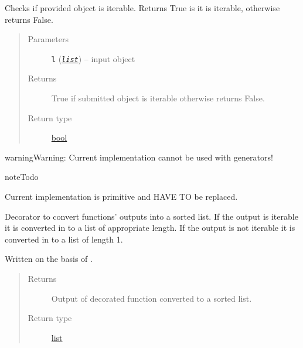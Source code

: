 \documentclass[a4paper,10pt,english]{sphinxmanual}
\begin{document}
\begin{fulllineitems}
\label{aqueduct.utils.helpers:aqueduct.utils.helpers.is_iterable}
Checks if provided object is iterable.
Returns True is it is iterable, otherwise returns False.
\begin{quote}\begin{description}
\item[{Parameters}] \leavevmode
\textbf{\texttt{l}} (\href{https://docs.python.org/2/library/functions.html\#list}{\emph{\texttt{list}}}) -- input object

\item[{Returns}] \leavevmode
True if submitted object is iterable otherwise returns False.

\item[{Return type}] \leavevmode
\href{https://docs.python.org/2/library/functions.html\#bool}{bool}

\end{description}\end{quote}

\begin{notice}{warning}{Warning:}
Current implementation cannot be used with generators!
\end{notice}

\begin{notice}{note}{Todo}

Current implementation is primitive and HAVE TO be replaced.
\end{notice}

\end{fulllineitems}


\begin{fulllineitems}
\label{aqueduct.utils.helpers:aqueduct.utils.helpers.sortify}
Decorator to convert functions' outputs into a sorted list. If the output is iterable it is converted in to a list
of appropriate length. If the output is not iterable it is converted in to a list of length 1.

Written on the basis of {\hyperref[aqueduct.utils.helpers:aqueduct.utils.helpers.listify]{}}.
\begin{quote}\begin{description}
\item[{Returns}] \leavevmode
Output of decorated function converted to a sorted list.

\item[{Return type}] \leavevmode
\href{https://docs.python.org/2/library/functions.html\#list}{list}

\end{description}\end{quote}

\end{fulllineitems}
\end{document}
